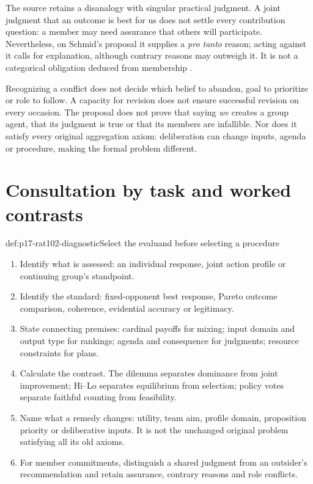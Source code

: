 The source retains a disanalogy with singular practical judgment. A joint
judgment that an outcome is best for us does not settle every contribution
question: a member may need assurance that others will participate.
Nevertheless, on Schmid's proposal it supplies a \emph{pro tanto} reason;
acting against it calls for explanation, although contrary reasons may
outweigh it. It is not a categorical obligation deduced from membership
\parencite[pp.~597--598]{Schmid2021CollectiveRationality}.

Recognizing a conflict does not decide which belief to abandon, goal to
prioritize or role to follow. A capacity for revision does not ensure
successful revision on every occasion. The proposal does not prove that
saying \emph{we} creates a group agent, that its judgment is true or that
its members are infallible. Nor does it satisfy every original aggregation
axiom: deliberation can change inputs, agenda or procedure, making the
formal problem different.

\section{Consultation by task and worked contrasts}
\label{sec:p17-rat102-use}

\begin{hbmethod}{def:p17-rat102-diagnostic}{Select the evaluand before selecting a procedure}
\begin{enumerate}
\item Identify what is assessed: an individual response, joint action profile
      or continuing group's standpoint.
\item Identify the standard: fixed-opponent best response, Pareto outcome
      comparison, coherence, evidential accuracy or legitimacy.
\item State connecting premises: cardinal payoffs for mixing; input domain
      and output type for rankings; agenda and consequence for judgments;
      resource constraints for plans.
\item Calculate the contrast. The dilemma separates dominance from joint
      improvement; Hi--Lo separates equilibrium from selection; policy votes
      separate faithful counting from feasibility.
\item Name what a remedy changes: utility, team aim, profile domain,
      proposition priority or deliberative inputs. It is not the unchanged
      original problem satisfying all its old axioms.
\item For member commitments, distinguish a shared judgment from an
      outsider's recommendation and retain assurance, contrary reasons and
      role conflicts.
\end{enumerate}
\end{hbmethod}

